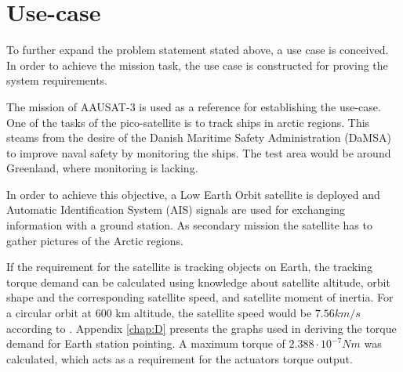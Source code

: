 
\section{Use-case}\label{sec:useCase}
To further expand the problem statement stated above, a use case is conceived. In order to achieve the mission task, the use case is constructed for proving the system requirements.

The mission of AAUSAT-3 is used as a reference for establishing the use-case. One of the tasks of the pico-satellite is to track ships in arctic regions. This steams from the desire of the Danish Maritime Safety Administration (DaMSA) to improve naval safety by monitoring the ships. The test area would be around Greenland, where monitoring is lacking. %


In order to achieve this objective, a Low Earth Orbit    satellite is deployed and Automatic Identification System (AIS) signals are used for exchanging information with a ground station. As secondary mission the satellite has to gather pictures of the Arctic regions.

If the requirement for the satellite is tracking objects on Earth, the tracking torque demand can be calculated using knowledge about satellite altitude, orbit shape and the corresponding satellite speed, and satellite moment of inertia. For a circular orbit at 600 km altitude, the satellite speed would be $7.56 km/s$  according to \cite{satSpeed}. Appendix \ref{chap:D} presents the graphs used in deriving the torque demand for Earth station pointing. A maximum torque of ${2.388 \cdot 10^{-7} Nm}$ was calculated, which acts as a requirement for the actuators torque output.